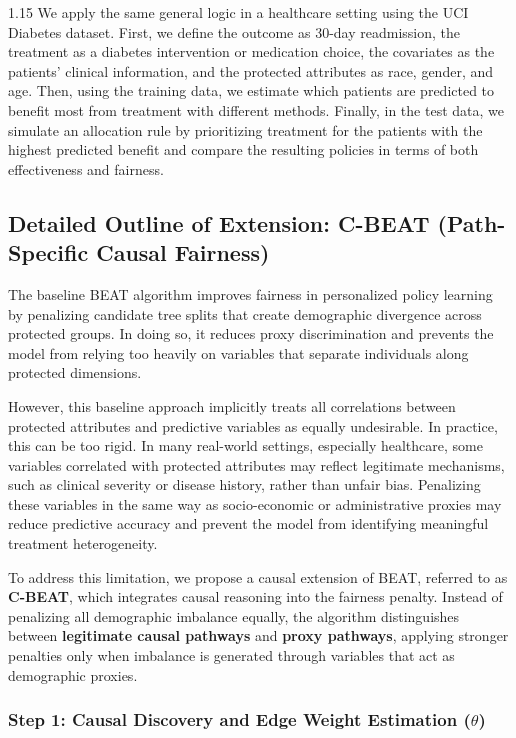 \documentclass[11pt, a4paper]{article}
\begin{document}
\begin{spacing}{1.15}
We apply the same general logic in a healthcare setting using the UCI Diabetes dataset. First, we define the outcome as 30-day readmission, the treatment as a diabetes intervention or medication choice, the covariates as the patients’ clinical information, and the protected attributes as race, gender, and age. Then, using the training data, we estimate which patients are predicted to benefit most from treatment with different methods. Finally, in the test data, we simulate an allocation rule by prioritizing treatment for the patients with the highest predicted benefit and compare the resulting policies in terms of both effectiveness and fairness.


\subsection*{Detailed Outline of Extension: C-BEAT (Path-Specific Causal Fairness)}

The baseline BEAT algorithm improves fairness in personalized policy learning by penalizing candidate tree splits that create demographic divergence across protected groups. In doing so, it reduces proxy discrimination and prevents the model from relying too heavily on variables that separate individuals along protected dimensions.

However, this baseline approach implicitly treats all correlations between protected attributes and predictive variables as equally undesirable. In practice, this can be too rigid. In many real-world settings, especially healthcare, some variables correlated with protected attributes may reflect legitimate mechanisms, such as clinical severity or disease history, rather than unfair bias. Penalizing these variables in the same way as socio-economic or administrative proxies may reduce predictive accuracy and prevent the model from identifying meaningful treatment heterogeneity.

To address this limitation, we propose a causal extension of BEAT, referred to as \textbf{C-BEAT}, which integrates causal reasoning into the fairness penalty. Instead of penalizing all demographic imbalance equally, the algorithm distinguishes between \textbf{legitimate causal pathways} and \textbf{proxy pathways}, applying stronger penalties only when imbalance is generated through variables that act as demographic proxies.

\subsubsection*{Step 1: Causal Discovery and Edge Weight Estimation ($\theta$)}


\end{spacing}
\end{document}
